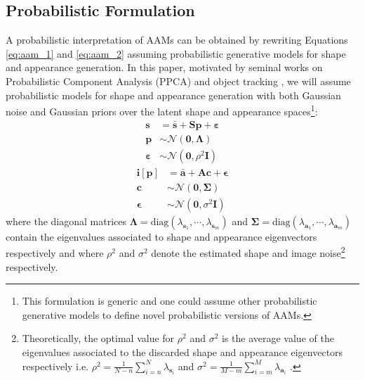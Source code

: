 \subsection{Probabilistic Formulation}
\label{sec:probabilistic_aam}

A probabilistic interpretation of AAMs can be obtained by rewriting Equations \ref{eq:aam_1} and \ref{eq:aam_2} assuming probabilistic generative models for shape and appearance generation. In this paper, motivated by seminal works on Probabilistic Component Analysis (PPCA) and object tracking \cite{Tipping1999, Roweis1998, Moghaddam1997}, we will assume probabilistic models for shape and appearance generation with both Gaussian noise and Gaussian priors over the latent shape and appearance spaces\footnote{This formulation is generic and one could assume other probabilistic generative models \cite{vanderMaaten2010, Bach2005, Prince2012, Nicolau2014} to define novel probabilistic versions of AAMs.}:
\begin{equation}
	\begin{aligned}
		\mathbf{s} & = \bar{\mathbf{s}} + \mathbf{S} \mathbf{p} + \boldsymbol{\varepsilon}
		\\
		\mathbf{p} & \sim \mathcal{N} \left( \mathbf{0}, \mathbf{\Lambda} \right) 
		\\
		\boldsymbol{\varepsilon} & \sim \mathcal{N} \left( \mathbf{0}, \rho^2 \mathbf{I} \right) 
	\end{aligned}
	\label{eq:paam_1}
\end{equation}
\begin{equation}
	\begin{aligned}
		\mathbf{i}[\mathbf{p}] & = \bar{\mathbf{a}} + \mathbf{A} \mathbf{c} + \boldsymbol{\epsilon}
		\\
		\mathbf{c} & \sim \mathcal{N} \left( \mathbf{0}, \mathbf{\Sigma} \right) 
		\\
		\boldsymbol{\epsilon} & \sim \mathcal{N} \left( \mathbf{0}, \sigma^2 \mathbf{I} \right) 
	\end{aligned}
	\label{eq:paam_2}
\end{equation}
where the diagonal matrices $\mathbf{\Lambda} = \textrm{diag}(\lambda_{\mathbf{s}_1}, \cdots, \lambda_{\mathbf{s}_m})$ and $\mathbf{\Sigma} = \textrm{diag}(\lambda_{\mathbf{a}_1}, \cdots, \lambda_{\mathbf{a}_m})$ contain the eigenvalues associated to shape and appearance eigenvectors respectively and where $\rho^2$ and $\sigma^2$ denote the estimated shape and image noise\footnote{\label{foot:noise}Theoretically, the optimal value for $\rho^2$ and $\sigma^2$ is the average value of the eigenvalues associated to the discarded shape and appearance eigenvectors respectively i.e. \mbox{$\rho^{2} = \frac{1}{N-n}\sum_{i=n}^N \lambda_{\mathbf{s}_i}$} and \mbox{$\sigma^{2} = \frac{1}{M-m}\sum_{i=m}^M \lambda_{\mathbf{a}_i}$} \cite{Moghaddam1997}.} respectively.

